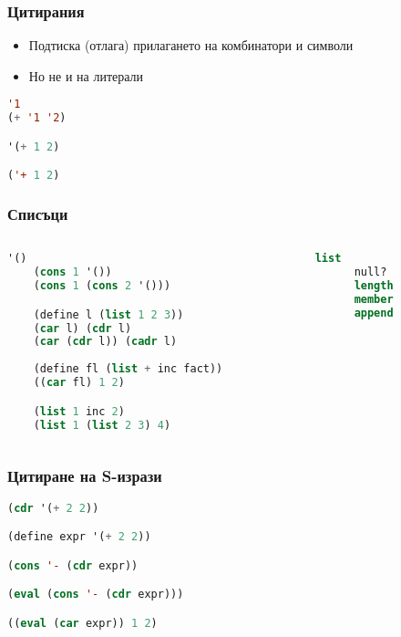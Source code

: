 \documentclass{beamer}
\begin{document}
\begin{frame}[fragile]
\frametitle{Цитирания}

\begin{itemize}
  \item Подтиска (отлага) прилагането на комбинатори и символи
  \item Но не и на литерали
\end{itemize}

\begin{lstlisting}[language=Lisp]
'1
(+ '1 '2)

'(+ 1 2)

('+ 1 2)
\end{lstlisting}

\end{frame}



\begin{frame}[fragile]
\frametitle{Списъци}

\begin{columns}[t]
  \begin{column}{0.7\textwidth}
    \begin{lstlisting}[language=Lisp]
    '()
    (cons 1 '())
    (cons 1 (cons 2 '()))

    (define l (list 1 2 3))
    (car l) (cdr l)
    (car (cdr l)) (cadr l)
  
    (define fl (list + inc fact))
    ((car fl) 1 2)

    (list 1 inc 2)
    (list 1 (list 2 3) 4)
  \end{lstlisting}

  \end{column}
  \begin{column}{0.3\textwidth}
    \begin{lstlisting}[language=Lisp]
      list
      null?
      length
      member
      append
    \end{lstlisting}
  \end{column} 
\end{columns}

\end{frame}


\begin{frame}[fragile]
\frametitle{Цитиране на S-изрази}

\begin{lstlisting}[language=Lisp]
(cdr '(+ 2 2))

(define expr '(+ 2 2))

(cons '- (cdr expr))

(eval (cons '- (cdr expr)))

((eval (car expr)) 1 2)
\end{lstlisting}

\end{frame}
\end{document}
